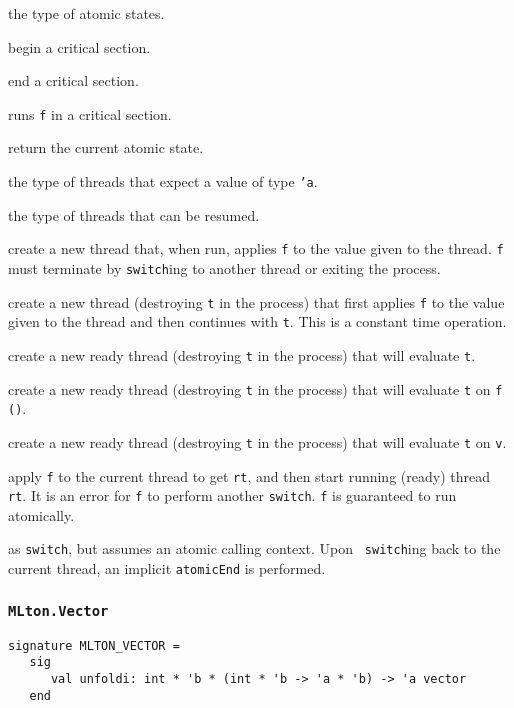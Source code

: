 \begin{description}

the type of atomic states.

begin a critical section.

end a critical section.

runs {\tt f} in a critical section.

return the current atomic state.

the type of threads that expect a value of type {\tt 'a}.

the type of threads that can be resumed.

create a new thread that, when run, applies {\tt f} to the value given
to the thread.  {\tt f} must terminate by {\tt switch}ing to another
thread or exiting the process.

create a new thread (destroying {\tt t} in the process) that first
applies {\tt f} to the value given to the thread and then continues
with {\tt t}.  This is a constant time operation.

create a new ready thread (destroying {\tt t} in the process)
that will evaluate {\tt t}.

create a new ready thread (destroying {\tt t} in the process)
that will evaluate {\tt t} on {\tt f ()}.

create a new ready thread (destroying {\tt t} in the process)
that will evaluate {\tt t} on {\tt v}.

apply {\tt f} to the current thread to get {\tt rt}, and then start
running (ready) thread {\tt rt}.  It is an error for {\tt f} to
perform another {\tt switch}.  {\tt f} is guaranteed to run
atomically.

as {\tt switch}, but assumes an atomic calling context.  Upon {\tt
switch}ing back to the current thread, an implicit {\tt atomicEnd} is
performed.

\end{description}
%
\subsubsection{\tt MLton.Vector}

\begin{verbatim}
signature MLTON_VECTOR =
   sig
      val unfoldi: int * 'b * (int * 'b -> 'a * 'b) -> 'a vector
   end
\end{verbatim}

